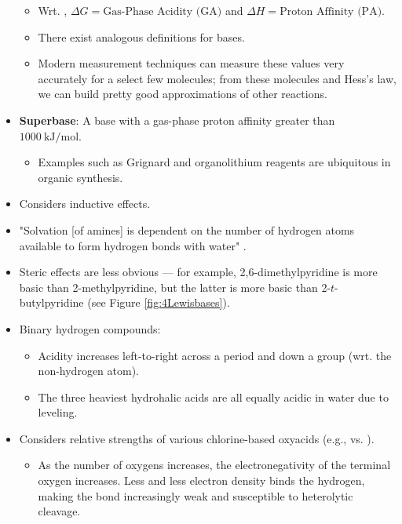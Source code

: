 \documentclass[../notes.tex]{subfiles}
\begin{document}
\begin{itemize}
    \begin{itemize}
        \item Wrt. , $\Delta G=\text{Gas-Phase Acidity (GA)}$ and $\Delta H=\text{Proton Affinity (PA)}$.
        \item There exist analogous definitions for bases.
        \item Modern measurement techniques can measure these values very accurately for a select few molecules; from these molecules and Hess's law, we can build pretty good approximations of other reactions.
    \end{itemize}
    \item \textbf{Superbase}: A base with a gas-phase proton affinity greater than $\SI[per-mode=symbol]{1000}{\kilo\joule\per\mole}$.
    \begin{itemize}
        \item Examples such as Grignard and organolithium reagents are ubiquitous in organic synthesis.
    \end{itemize}
    \item Considers inductive effects.
    \item "Solvation [of amines] is dependent on the number of hydrogen atoms available to form  hydrogen bonds with water" \parencite[181]{bib:MiesslerFischerTarr}.
    \item Steric effects are less obvious --- for example, 2,6-dimethylpyridine is more basic than 2-methylpyridine, but the latter is more basic than 2-$t$-butylpyridine (see Figure \ref{fig:4Lewisbases}).
    \item Binary hydrogen compounds:
    \begin{itemize}
        \item Acidity increases left-to-right across a period and down a group (wrt. the non-hydrogen atom).
        \item The three heaviest hydrohalic acids are all equally acidic in water due to leveling.
    \end{itemize}
    \item Considers relative strengths of various chlorine-based oxyacids (e.g.,  vs. ).
    \begin{itemize}
        \item As the number of oxygens increases, the electronegativity of the terminal oxygen increases. Less and less electron density binds the hydrogen, making the bond increasingly weak and susceptible to heterolytic cleavage.
    \end{itemize}

\end{itemize}
\end{document}
